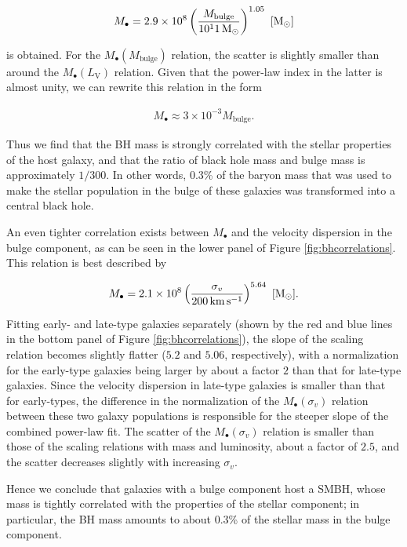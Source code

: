 \documentclass[a4paper,11pt]{article}
\begin{document}
\begin{align*}
    M_\bullet = 2.9\times10^8\left(\frac{M_\mathrm{bulge}}{10^11\,{\rm M_\odot}}\right)^{1.05} ~ [{\rm M_\odot}]
\end{align*}

{\noindent}is obtained. For the $M_\bullet(M_\mathrm{bulge})$ relation, the scatter is slightly smaller than around the $M_\bullet(L_\mathrm{V})$ relation. Given that the power-law index in the latter is almost unity, we can rewrite this relation in the form

\begin{align*}
    M_\bullet \approx 3\times10^{-3}M_\mathrm{bulge}.
\end{align*}

{\noindent}Thus we find that the BH mass is strongly correlated with the stellar properties of the host galaxy, and that the ratio of black hole mass and bulge mass is approximately $1/300$. In other words, 0.3\% of the baryon mass that was used to make the stellar population in the bulge of these galaxies was transformed into a central black hole.

{\noindent}An even tighter correlation exists between $M_\bullet$ and the velocity dispersion in the bulge component, as can be seen in the lower panel of Figure \ref{fig:bhcorrelations}. This relation is best described by

\begin{align*}
    M_\bullet = 2.1\times 10^8\left(\frac{\sigma_v}{200\,{\rm km\,s^{-1}}}\right)^{5.64} ~ [{\rm M_\odot}].
\end{align*}

{\noindent}Fitting early- and late-type galaxies separately (shown by the red and blue lines in the bottom panel of Figure \ref{fig:bhcorrelations}), the slope of the scaling relation becomes slightly flatter ($5.2$ and $5.06$, respectively), with a normalization for the early-type galaxies being larger by about a factor $2$ than that for late-type galaxies. Since the velocity dispersion in late-type galaxies is smaller than that for early-types, the difference in the normalization of the $M_\bullet(\sigma_v)$ relation between these two galaxy populations is responsible for the steeper slope of the combined power-law fit. The scatter of the $M_\bullet(\sigma_v)$ relation is smaller than those of the scaling relations with mass and luminosity, about a factor of $2.5$, and the scatter decreases slightly with increasing  $\sigma_v$.

{\noindent}Hence we conclude that galaxies with a bulge component host a SMBH, whose mass is tightly correlated with the properties of the stellar component; in particular, the BH mass amounts to about 0.3\% of the stellar mass in the bulge component.
\end{document}
